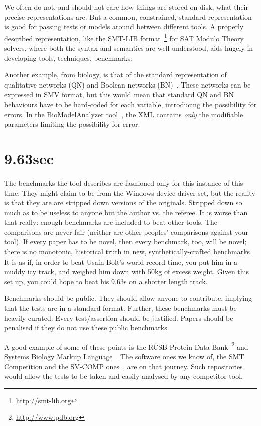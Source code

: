 \documentclass[conference]{IEEEtran}
\begin{document}
We often do not, and should not care how things are stored on disk,
what their precise representations are. But a common, constrained, standard
representation is good for passing tests or models around between
different tools. A properly described representation, like the SMT-LIB
format~\footnote{\url{http://smt-lib.org}} for SAT Modulo Theory
solvers, where both the syntax and semantics are well understood, aids
hugely in developing tools, techniques, benchmarks.

Another example, from biology, is that of the standard representation
of qualitative networks (QN) and Boolean
networks (BN)~\cite{Kauffman1969,Schaub2007}.  These networks can be
expressed in SMV format, but this would mean that standard QN and BN
behaviours have to be hard-coded for each variable, introducing the
possibility for errors. In the BioModelAnalyzer
tool~\cite{Benque2012}, the XML contains \emph{only} the modifiable
parameters limiting the possibility for error.


\section{9.63sec} 

The benchmarks the tool describes are fashioned only for this instance
of this time. They might claim to be from the Windows device driver
set, but the reality is that they are are stripped down versions of
the originals. Stripped down so much as to be useless to anyone but
the author vs. the referee. It is worse than that really: enough
benchmarks are included to beat other tools. The comparisons are never
fair (neither are other peoples' comparisons against your tool). If
every paper has to be novel, then every benchmark, too, will be novel;
there is no monotonic, historical truth in new, synthetically-crafted
benchmarks. It is as if, in order to beat Usain Bolt's world record
time, you put him in a muddy icy track, and weighed him down with 50kg
of excess weight. Given this set up, you could hope to beat his 9.63s
on a shorter length track.

Benchmarks should be public. They should allow anyone to contribute,
implying that the tests are in a standard format. Further, these
benchmarks must be heavily curated. Every test/assertion should be
justified. Papers should be penalised if they do not use these public
benchmarks.

A good example of some of these points is the RCSB Protein Data
Bank~\footnote{\url{http://www.pdb.org}} and Systems Biology Markup
Language~\cite{Hucka2003,Chaouiya2013}. The software ones we know of,
the SMT Competition and the SV-COMP ones~\cite{SMTComp2014,
SVCOMP2015}, are on that journey. Such repositories would allow the
tests to be taken and easily analysed by any competitor tool.
\end{document}
